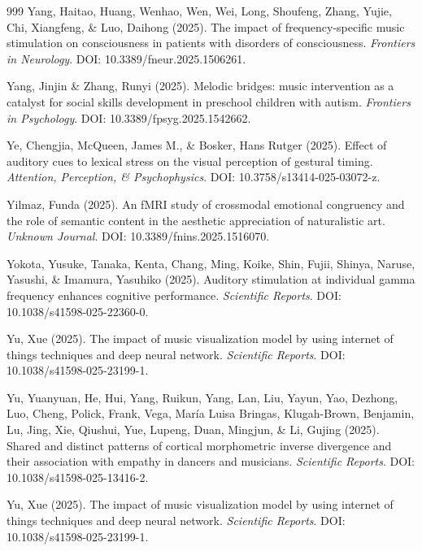 \documentclass[9pt,onecolumn]{article}
\begin{document}
\begin{thebibliography}{999}
Yang, Haitao, Huang, Wenhao, Wen, Wei, Long, Shoufeng, Zhang, Yujie, Chi, Xiangfeng, \& Luo, Daihong (2025). The impact of frequency-specific music stimulation on consciousness in patients with disorders of consciousness. \textit{Frontiers in Neurology}. DOI: 10.3389/fneur.2025.1506261.

Yang, Jinjin \& Zhang, Runyi (2025). Melodic bridges: music intervention as a catalyst for social skills development in preschool children with autism. \textit{Frontiers in Psychology}. DOI: 10.3389/fpsyg.2025.1542662.

Ye, Chengjia, McQueen, James M., \& Bosker, Hans Rutger (2025). Effect of auditory cues to lexical stress on the visual perception of gestural timing. \textit{Attention, Perception, \& Psychophysics}. DOI: 10.3758/s13414-025-03072-z.

Yilmaz, Funda (2025). An fMRI study of crossmodal emotional congruency and the role of semantic content in the aesthetic appreciation of naturalistic art. \textit{Unknown Journal}. DOI: 10.3389/fnins.2025.1516070.

Yokota, Yusuke, Tanaka, Kenta, Chang, Ming, Koike, Shin, Fujii, Shinya, Naruse, Yasushi, \& Imamura, Yasuhiko (2025). Auditory stimulation at individual gamma frequency enhances cognitive performance. \textit{Scientific Reports}. DOI: 10.1038/s41598-025-22360-0.

Yu, Xue (2025). The impact of music visualization model by using internet of things techniques and deep neural network. \textit{Scientific Reports}. DOI: 10.1038/s41598-025-23199-1.

Yu, Yuanyuan, He, Hui, Yang, Ruikun, Yang, Lan, Liu, Yayun, Yao, Dezhong, Luo, Cheng, Polick, Frank, Vega, María Luisa Bringas, Klugah-Brown, Benjamin, Lu, Jing, Xie, Qiushui, Yue, Lupeng, Duan, Mingjun, \& Li, Gujing (2025). Shared and distinct patterns of cortical morphometric inverse divergence and their association with empathy in dancers and musicians. \textit{Scientific Reports}. DOI: 10.1038/s41598-025-13416-2.

Yu, Xue (2025). The impact of music visualization model by using internet of things techniques and deep neural network. \textit{Scientific Reports}. DOI: 10.1038/s41598-025-23199-1.


\end{thebibliography}
\end{document}
